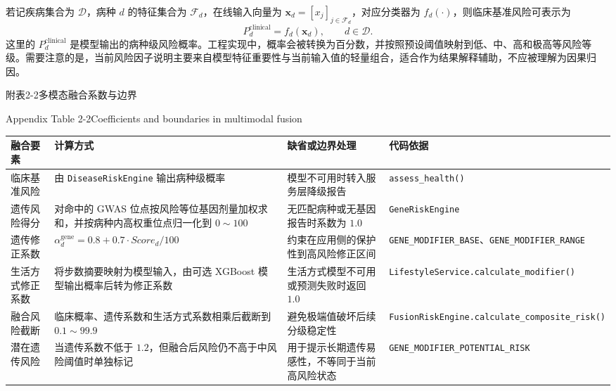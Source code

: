 \documentclass[UTF8, a4paper, 12pt, oneside]{ctexrep}
\numberwithin{equation}{chapter}
\newcommand{\codeid}[1]{{\begingroup\urlstyle{rm}\nolinkurl{#1}\endgroup}}
\begin{document}
{\vspace{\baselineskip}
若记疾病集合为 \(\mathcal{D}\)，病种 \(d\) 的特征集合为 \(\mathcal{F}_d\)，在线输入向量为 \(\mathbf{x}_d=[x_j]_{j\in\mathcal{F}_d}\)，对应分类器为 \(f_d(\cdot)\)，则临床基准风险可表示为
\begin{equation*}
P_d^{\mathrm{clinical}} = f_d(\mathbf{x}_d), \qquad d \in \mathcal{D}.
\tag{附2-1}
\end{equation*}
这里的 \(P_d^{\mathrm{clinical}}\) 是模型输出的病种级风险概率。工程实现中，概率会被转换为百分数，并按照预设阈值映射到低、中、高和极高等风险等级。需要注意的是，当前风险因子说明主要来自模型特征重要性与当前输入值的轻量组合，适合作为结果解释辅助，不应被理解为因果归因。

\vspace{0.5\baselineskip}
\begin{center}
{\songti{}附表2-2\quad 多模态融合系数与边界\par}
{\rmfamily{}Appendix Table 2-2\quad Coefficients and boundaries in multimodal fusion\par}
\end{center}
\vspace{-0.5\baselineskip}
{\songti{}
\noindent\begin{tabular}{@{}>{\raggedright\arraybackslash}p{} >{\raggedright\arraybackslash}p{} >{\raggedright\arraybackslash}p{} >{\raggedright\arraybackslash}p{}@{}}
\toprule
融合要素 & 计算方式 & 缺省或边界处理 & 代码依据 \\
\midrule
临床基准风险 & 由 \codeid{DiseaseRiskEngine} 输出病种级概率 & 模型不可用时转入服务层降级报告 & \codeid{assess_health()} \\
遗传风险得分 & 对命中的 GWAS 位点按风险等位基因剂量加权求和，并按病种内高权重位点归一化到 \(0\sim100\) & 无匹配病种或无基因报告时系数为 \(1.0\) & \codeid{GeneRiskEngine} \\
遗传修正系数 & \(\alpha_d^{\mathrm{gene}}=0.8+0.7\cdot Score_d/100\) & 约束在应用侧的保护性到高风险修正区间 & \codeid{GENE_MODIFIER_BASE}、\codeid{GENE_MODIFIER_RANGE} \\
生活方式修正系数 & 将步数摘要映射为模型输入，由可选 XGBoost 模型输出概率后转为修正系数 & 生活方式模型不可用或预测失败时返回 \(1.0\) & \codeid{LifestyleService.calculate_modifier()} \\
融合风险截断 & 临床概率、遗传系数和生活方式系数相乘后截断到 \(0.1\sim99.9\) & 避免极端值破坏后续分级稳定性 & \codeid{FusionRiskEngine.calculate_composite_risk()} \\
潜在遗传风险 & 当遗传系数不低于 \(1.2\)，但融合后风险仍不高于中风险阈值时单独标记 & 用于提示长期遗传易感性，不等同于当前高风险状态 & \codeid{GENE_MODIFIER_POTENTIAL_RISK} \\
\bottomrule
\end{tabular}
}

}
\end{document}
